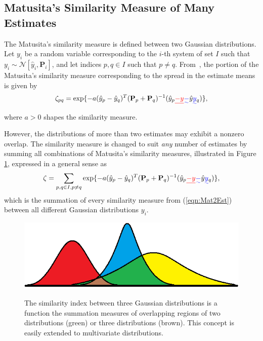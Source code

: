 \documentclass[letterpaper, 10pt, conference]{ieeeconf}
\newcommand{\refeqn}[1]{(\ref{eqn:#1})}
\providecommand{\DIFadd}[1]{{\protect\color{blue}\uwave{#1}}} %
\providecommand{\DIFdel}[1]{{\protect\color{red}\sout{#1}}}                      %
\providecommand{\DIFaddbegin}{} %
\providecommand{\DIFaddend}{} %
\providecommand{\DIFdelbegin}{} %
\providecommand{\DIFdelend}{} %
\begin{document}
\subsection{Matusita's Similarity Measure of Many Estimates}

The Matusita's similarity measure is defined between two Gaussian distributions.
Let $y_i$ be a random variable corresponding to the $i$-th system of set $I$ such that $y_i \sim \mathcal{N}[\hat y_i,{\mathbf P}_i]$, and let indices $p,q\in I$ such that $p\neq q$.
From~\cite{KauLovLee14}, the portion of the Matusita's similarity measure corresponding to the spread in the estimate means is given by
\begin{align}
\zeta_{pq}=\exp \{-a(\DIFaddbegin \hat  y_{p} \DIFaddend- \DIFaddbegin \hat  y_{q}\DIFaddend)^T({\mathbf P}_{p}
+{\mathbf P}_{q})^{-1}(\DIFaddbegin \hat  y_{p} \DIFaddend\DIFdelbegin \DIFdel{-y}\DIFdelend \DIFaddbegin \DIFadd{-}\hat  y \DIFadd{y}\DIFaddend _{q})\},\label{eqn:Mat2Est}
\end{align}
where $a>0$ shapes the similarity measure.

However, the distributions of more than two estimates may exhibit a nonzero overlap.
The similarity measure is changed to suit \emph{any} number of estimates by summing all combinations of Matusita's similarity measures, illustrated in Figure \ref{fig:SimMeas}, expressed in a general sense as
\begin{align}
\zeta=\sum\limits_{p,q\in I,p\neq q}\exp \{-a(\DIFaddbegin \hat \DIFaddend y_{p}- \DIFaddbegin \hat \DIFaddend y_{q})^T({\mathbf P}_{p}
+{\mathbf P}_{q})^{-1}(\DIFaddbegin \hat \DIFaddend y_{p}\DIFdelbegin \DIFdel{-y}\DIFdelend \DIFaddbegin \DIFadd{-}\hat y \DIFadd{y}\DIFaddend _{q})\},
\end{align}
which is the summation of every similarity measure from \refeqn{Mat2Est} between all different Gaussian distributions $y_i$.
\begin{figure}
\centerline{
		{\includegraphics[width=\columnwidth]{GaussianDistOverlap1D.png}}
	}
\caption{The similarity index between three Gaussian distributions is a function the summation measures of overlapping regions of two distributions (green) or three distributions (brown). This concept is easily extended to multivariate distributions.
}\label{fig:SimMeas}
\end{figure}
\end{document}
